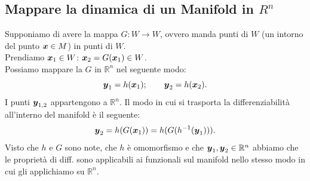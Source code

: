 \subsection{Mappare la dinamica di un Manifold in $R^n$}%
\label{sub:Mappare la dinamica di un Manifold in Rn }
Supponiamo di avere la mappa $G: W\to W$, ovvero manda punti di $W$ (un intorno del punto $\boldsymbol{x}  \in M$) in punti di $W$.\\
Prendiamo $\boldsymbol{x}_1 \in W$: $\boldsymbol{x}_2 = G(\boldsymbol{x}_1)\in W$.\\
Possiamo mappare la $G$ in $\mathbb{R}^n$ nel seguente modo:
\[
    \boldsymbol{y}_1 = h(\boldsymbol{x}_1); \qquad \boldsymbol{y}_2 = h(\boldsymbol{x}_2)
.\] 
I punti $\boldsymbol{y}_{1,2}$ appartengono a $\mathbb{R}^n$. Il modo in cui si trasporta la differenziabilità all'interno del manifold è il seguente:
\[
    \boldsymbol{y}_2 = h(G(\boldsymbol{x}_1)) = h(G(h^{-1}(\boldsymbol{y}_1)))
.\] 
Visto che $h$ e $G$ sono note, che $h$ è omomorfismo e che $\boldsymbol{y}_1, \boldsymbol{y}_2 \in \mathbb{R}^n$ abbiamo che le proprietà di diff. sono applicabili ai funzionali sul manifold nello stesso modo in cui gli applichiamo su $\mathbb{R}^n$.
